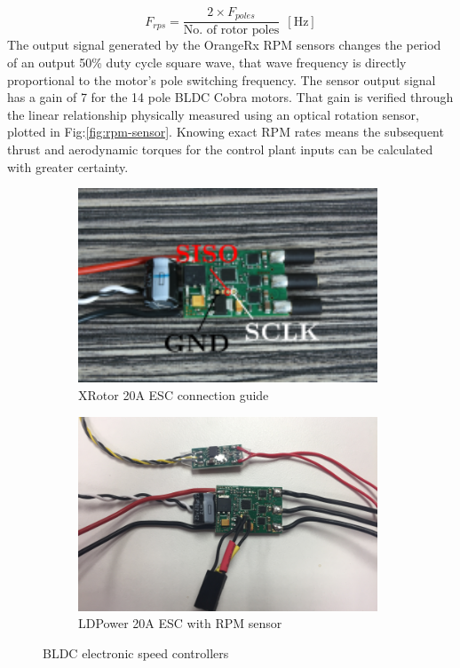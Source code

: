 \begin{equation}
F_{rps}=\frac{2\times F_{poles}}{\text{No. of rotor poles}}~~[\text{Hz}]
\end{equation}
The output signal generated by the OrangeRx RPM sensors changes the period of an output 50\% duty cycle square wave, that wave frequency is directly proportional to the motor's pole switching frequency. The sensor output signal has a gain of 7 for the 14 pole BLDC Cobra motors. That gain is verified through the linear relationship physically measured using an optical rotation sensor, plotted in Fig:\ref{fig:rpm-sensor}. Knowing exact RPM rates means the subsequent thrust and aerodynamic torques for the control plant inputs can be calculated with greater certainty.
\par
\begin{figure}[hbtp]
\begin{subfigure}{0.5\textwidth}
\centering
\includegraphics[width=0.98\textwidth]{figs/xrotor-20A}
\caption{XRotor 20A ESC connection guide\cite{xrotor}}
\label{fig:xrotor-20A}
\end{subfigure}
\begin{subfigure}{0.5\textwidth}
\centering
\includegraphics[width=0.98\textwidth]{figs/ldpower-20A}
\caption{LDPower 20A ESC with RPM sensor}
\label{fig:ldpower-20A}
\end{subfigure}
\vspace{-8pt}
\caption{BLDC electronic speed controllers}
\vspace{-8pt}
\end{figure}
